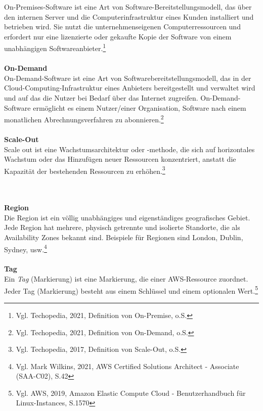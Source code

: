 On-Premises-Software ist eine Art von Software-Bereitstellungsmodell, das über den internen Server und die Computerinfrastruktur eines Kunden installiert und betrieben wird. Sie nutzt die unternehmenseigenen Computerressourcen und erfordert nur eine lizenzierte oder gekaufte Kopie der Software von einem unabhängigen Softwareanbieter.\footnote{Vgl. Techopedia, 2021, Definition von On-Premise, o.S.\cite{OP}}
\\\\
\textbf{On-Demand}\\
On-Demand-Software ist eine Art von Softwarebereitstellungsmodell, das in der Cloud-Computing-Infrastruktur eines Anbieters bereitgestellt und verwaltet wird und auf das die Nutzer bei Bedarf über das Internet zugreifen. On-Demand-Software ermöglicht es einem Nutzer/einer Organisation, Software nach einem monatlichen Abrechnungsverfahren zu abonnieren.\footnote{Vgl. Techopedia, 2021, Definition von On-Demand, o.S.\cite{OD}}
\\\\
\textbf{Scale-Out}\\
Scale out ist eine Wachstumsarchitektur oder -methode, die sich auf horizontales Wachstum oder das Hinzufügen neuer Ressourcen konzentriert, anstatt die Kapazität der bestehenden Ressourcen zu erhöhen.\footnote{Vgl. Techopedia, 2017, Definition von Scale-Out, o.S.\cite{SO}}

\\\\
\textbf{Region}\\
Die Region ist ein völlig unabhängiges und eigenständiges geografisches Gebiet. Jede Region hat mehrere, physisch getrennte und isolierte Standorte, die als Availability Zones bekannt sind. Beispiele für Regionen sind London, Dublin, Sydney, usw.\footnote{Vgl. Mark Wilkins, 2021, AWS Certified Solutions Architect - Associate (SAA-C02)\cite{AWS1}, S.42}
\\\\
\textbf{Tag}\\
Ein \textit{Tag} (Markierung) ist eine Markierung, die einer AWS-Ressource zuordnet. Jeder Tag (Markierung) besteht aus einem Schlüssel und einem optionalen Wert.\footnote{Vgl. AWS, 2019, Amazon Elastic Compute Cloud - Benutzerhandbuch für Linux-Instances, S.1570\cite{AMZ26}}
